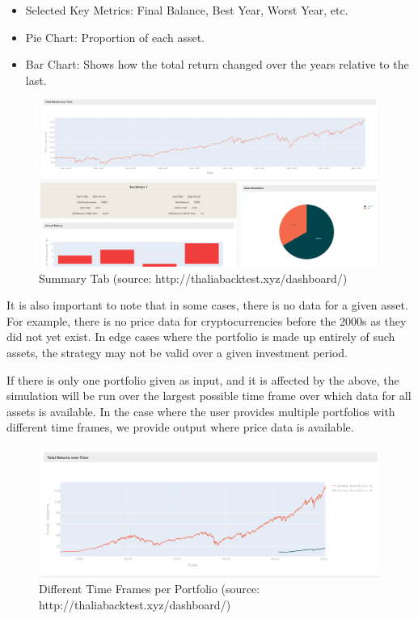 \documentclass[main.tex]{subfiles}
\begin{document}
\begin{itemize}
    \item Selected Key Metrics: Final Balance, Best Year, Worst Year, etc.
    \item Pie Chart: Proportion of each asset.
    \item Bar Chart: Shows how the total return changed over the years relative to the last.
\end{itemize}

\begin{figure}[H]
   \centering
   \includegraphics[width=\textwidth]{08Appendices/081User/081Pictures/summary.png}
   \caption{Summary Tab (source: http://thaliabacktest.xyz/dashboard/)}
   \label{summary}
\end{figure}

It is also important to note that in some cases, there is no data for a given asset. For example, there is no price data for cryptocurrencies before the 2000s as they did not yet exist. In edge cases where the portfolio is made up entirely of such assets, the strategy may not be valid over a given investment period. 

If there is only one portfolio given as input, and it is affected by the above, the simulation will be run over the largest possible time frame over which data for all assets is available. In the case where the user provides multiple portfolios with different time frames, we provide output where price data is available.

\begin{figure}[H]
   \centering
   \includegraphics[width=\textwidth]{08Appendices/081User/081Pictures/differences.png}
   \caption{Different Time Frames per Portfolio (source: http://thaliabacktest.xyz/dashboard/)}
\end{figure}
\end{document}
